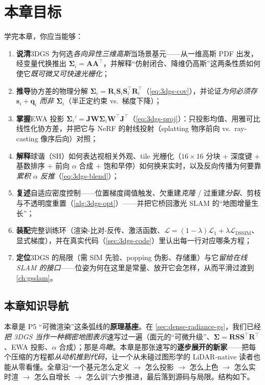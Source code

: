 \section*{本章目标}
学完本章，你应当能够：
\begin{enumerate}
  \item \textbf{说清}3DGS 为何选\emph{各向异性三维高斯}当场景基元——从一维高斯 PDF 出发，经变量代换推出 $\boldsymbol\Sigma_i=\mathbf A\mathbf A^\top$，并解释“仿射闭合、降维仍高斯”这两条性质如何使它\emph{既可微又可快速光栅化}；
  \item \textbf{推导}协方差的物理分解 $\boldsymbol\Sigma_i=\mathbf R_i\mathbf S_i\mathbf S_i^\top\mathbf R_i^\top$（\cref{eq:3dgs-cov}），并论证\emph{为何必须存 $\mathbf s_i+\mathbf q_i$ 而非 $\boldsymbol\Sigma_i$}（半正定约束 vs.\ 梯度下降）；
  \item \textbf{掌握}EWA 投影 $\boldsymbol\Sigma_i'=\mathbf J\mathbf W\boldsymbol\Sigma_i\mathbf W^\top\mathbf J^\top$（\cref{eq:3dgs-proj}）：只投影均值、用雅可比线性化协方差，并把它与 NeRF 的射线投射（splatting 物序前向 vs.\ ray-casting 像序后向）对照；
  \item \textbf{解释}球谐（SH）如何表达视相关外观、tile 光栅化（$16\times16$ 分块 $+$ 深度键 $+$ 基数排序 $+$ 前向 $\alpha$ 合成 $+$ 饱和早停）如何换来实时，以及反向传播为何要靠\emph{累积 $\alpha$ 反推}（\cref{eq:3dgs-blend}）；
  \item \textbf{复述}自适应密度控制——位置梯度阈值触发、欠重建\emph{克隆} / 过重建\emph{分裂}、剪枝与不透明度重置（\cref{alg:3dgs-opt}）——并把它桥回激光 SLAM 的“地图增量生长”；
  \item \textbf{装配}完整训练环（渲染-比对-反传、激活函数、$\mathcal L=(1-\lambda)\mathcal L_1+\lambda\mathcal L_{\mathrm{DSSIM}}$、显式梯度），并在真实代码（\cref{sec:3dgs-code}）里认出每一行对应哪条方程；
  \item \textbf{定位}3DGS 的局限（需 SfM 先验、popping 伪影、存储重）与它\emph{留给在线 SLAM 的接口}——位姿为何在这里是常量、放开它会怎样，从而平滑过渡到 \cref{ch:gsslam}。
\end{enumerate}

\subsection*{本章知识导航}
本章是 P5 “可微渲染”这条弧线的\textbf{原理基座}。在 \cref{sec:dense-radiance-gs}，我们已经\emph{把 3DGS 当作一种稠密地图表示}速写过一遍（面元的“可微升级”、$\boldsymbol\Sigma=\mathbf R\mathbf S\mathbf S^\top\mathbf R^\top$、EWA 投影、$\alpha$ 合成）；那是\emph{鸟瞰}。本章是那张速写的\textbf{逐步展开的新家}——把每个压缩的方程都\emph{从动机推到代码}，让一个从未碰过图形学的 LiDAR-native 读者也能从零看懂。全章沿“一个基元怎么定义 $\to$ 怎么投影 $\to$ 怎么上色 $\to$ 怎么实时渲 $\to$ 怎么自增长 $\to$ 怎么训”六步推进，最后落到源码与局限。结构如下。

